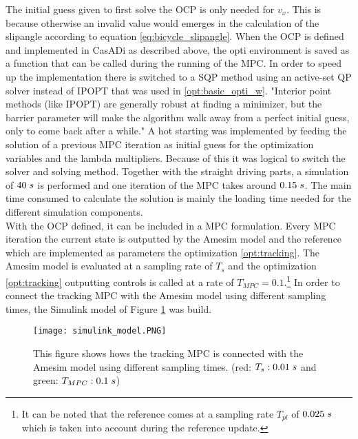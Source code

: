 The initial guess given to first solve the OCP is only needed for $v_x$. This is because otherwise an invalid value would emerges in the calculation of the slipangle according to equation \ref{eq:bicycle_slipangle}. When the OCP is defined and implemented in CasADi as described above, the opti environment is saved as a function that can be called during the running of the MPC. In order to speed up the implementation there is switched to a SQP method using an active-set QP solver instead of IPOPT that was used in \ref{opt:basic_opti_w}. "Interior point methods (like IPOPT) are generally robust at finding a minimizer, but the barrier parameter will make the algorithm walk away from a perfect initial guess, only to come back after a while." \cite{Gillis2019} A hot starting was implemented by feeding the solution of a previous MPC iteration as initial guess for the optimization variables and the lambda multipliers. Because of this it was logical to switch the solver and solving method. Together with the straight driving parts, a simulation of $40\hspace{1mm}s$ is performed and one iteration of the MPC takes around $0.15\hspace{1mm}s$. The main time consumed to calculate the solution is mainly the loading time needed for the different simulation components.\\

With the OCP defined, it can be included in a MPC formulation. Every MPC iteration the current state is outputted by the Amesim model and the reference which are implemented as parameters the optimization \ref{opt:tracking}. The Amesim model is evaluated at a sampling rate of $T_s$ and the optimization \ref{opt:tracking} outputting controls is called at a rate of $T_{MPC} = 0.1$.\footnote{It can be noted that the reference comes at a sampling rate $T_{pl}$ of $0.025\hspace{1mm}s$ which is taken into account during the reference update.}  In order to connect the tracking MPC with the Amesim model using different sampling times, the Simulink model of Figure \ref{fig:simulink_model} was build. 

\begin{figure}[h!]
	\centering
	\texttt{[image: simulink\_model.PNG]}
	\caption{This figure shows hows the tracking MPC is connected with the Amesim model using different sampling times. (red: $T_s: 0.01\hspace{1mm}s$ and green: $T_{MPC}:0.1\hspace{1mm}s$)}	
	\label{fig:simulink_model}
\end{figure}

